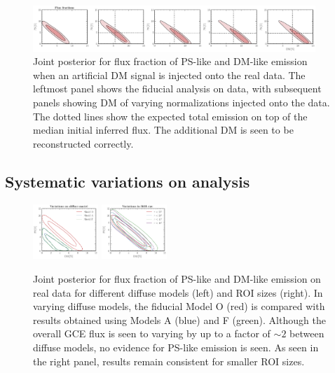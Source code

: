 \documentclass[prd,aps,10pt,nofootinbib,twocolumn,superscriptaddress,preprintnumbers,balancelastpage,longbibliography]{revtex4-1}
\begin{document}
%
\begin{figure}
    \centering
    \includegraphics[width=0.95\textwidth]{plots/data_sig_inj.pdf}
    \caption{Joint posterior for flux fraction of PS-like and DM-like emission when an artificial DM signal is injected onto the real data. The leftmost panel shows the fiducial analysis on \Fermi data, with subsequent panels showing DM of varying normalizations injected onto the data. The dotted lines show the expected total emission on top of the median initial inferred flux. The additional DM is seen to be reconstructed correctly.}
    \label{fig:sig_inj_data}
\end{figure}
%

\subsection{Systematic variations on analysis}
\label{sec:systematics}

%
\begin{figure}
    \centering
    \includegraphics[width=0.22\textwidth]{plots/dif_var.pdf}
    \includegraphics[width=0.22\textwidth]{plots/roi_var.pdf}
    \caption{Joint posterior for flux fraction of PS-like and DM-like emission on real \Fermi data for different diffuse models (left) and ROI sizes (right). In varying diffuse models, the fiducial Model O (red) is compared with results obtained using Models A (blue) and F (green). Although the overall GCE flux is seen to varying by up to a factor of $\sim2$ between diffuse models, no evidence for PS-like emission is seen. As seen in the right panel, results remain consistent for smaller ROI sizes.}
    \label{fig:variations}
\end{figure}
%
\end{document}
